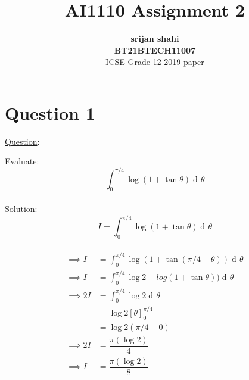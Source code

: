 \documentclass[journal,12pt,twocolumn]{IEEEtran}
\DeclareMathOperator{\di}{d\!}
\begin{document}
	\title{\textbf{AI1110 Assignment 2} }
	\author{\textbf{srijan shahi}\\\textbf{BT21BTECH11007}\\ ICSE Grade 12 2019 paper}
	\maketitle
	
	{\section*{Question 1}}
	
	{\large \underline{Question}:\newline}
	
	Evaluate:
	\begin{equation}
		\int_{0}^{{\pi/4}}  \log(1 + \tan\theta)\di \theta
	\end{equation}\\
	
	{\large \underline{Solution}:}\\
	 	\begin{equation}
	 I=\int_{0}^{{\pi/4}}  \log(1 + \tan\theta)\di \theta
	 \end{equation}\\
	\begin{align}
     \implies I &= \int_{0}^{{\pi/4}}  \log(1 + \tan (\pi/4 - \theta)	)\di \theta\\
     \implies I &= \int_{0}^{{\pi/4}}  \log2- log(1 + \tan\theta)	)\di \theta\\
     \implies 2I &= \int_{0}^{{\pi/4}}  \log2 \di \theta\\
     &={\log 2} \left[\theta \right]^{\pi/4}_{0}\\
	        	&= {\log 2}(\pi/4 - 0)\\
	\implies 2I &=\dfrac{{\pi} ({\log 2})}{4}  \\
	\implies I  &=  \dfrac{{\pi} ({\log 2})}{8}
		\end{align}
	
\end{document}
